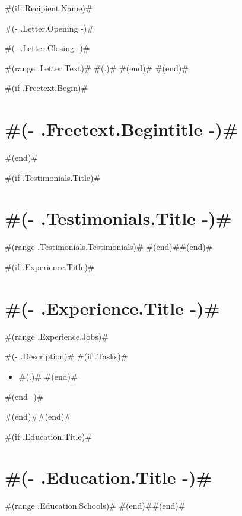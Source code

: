 \documentclass[10pt,a4paper,sans]{moderncv}
\begin{document}
#(if .Recipient.Name)#
  \date{ #(- .Letter.Date -)# }
  \opening{ #(- .Letter.Opening -)# }
  \closing{ #(- .Letter.Closing -)# }
  \makelettertitle
  #(range .Letter.Text)#
    #(.)#
  #(end)#
  \makeletterclosing
  \pagebreak
#(end)#


\makecvtitle

#(if .Freetext.Begin)#\section{ #(- .Freetext.Begintitle -)# }
#(end)#

#(if .Testimonials.Title)#\section{ #(- .Testimonials.Title -)# }
#(range .Testimonials.Testimonials)#
#(end)##(end)#

#(if .Experience.Title)#\section{ #(- .Experience.Title -)#  }
#(range .Experience.Jobs)#
{ #(- .Description)# 
  #(if .Tasks)#\begin{itemize}
    #(range .Tasks)# \item #(.)#
    #(end)#\end{itemize}
  #(end -)# }
#(end)##(end)#

#(if .Education.Title)#\section{ #(- .Education.Title -)#  }
#(range .Education.Schools)#
#(end)##(end)#
\end{document}
